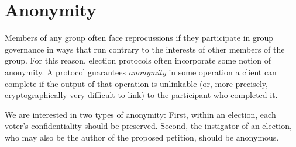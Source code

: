 \section{Anonymity}
Members of any group often face reprocussions if they participate in group
governance in ways that run contrary to the interests of other members of
the group. For this reason, election protocols often incorporate some notion
of anonymity. A protocol guarantees \emph{anonymity} in some operation a
client can complete if the output of that operation is unlinkable (or, more
precisely, cryptographically very difficult to link) to the participant who
completed it\cite{ford_hiding_2014}.

We are interested in two types of anonymity: First, within an election,
each voter's confidentiality should be preserved. Second, the instigator of an
election, who may also be the author of the proposed petition, should be
anonymous.

